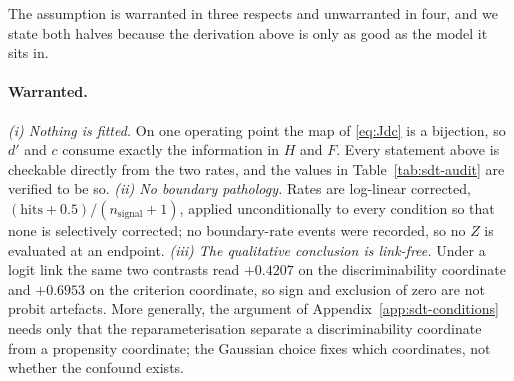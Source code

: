 The assumption is warranted in three respects and unwarranted in four, and we state both halves
because the derivation above is only as good as the model it sits in.

\paragraph{Warranted.} \emph{(i) Nothing is fitted.} On one operating point the map of
\eqref{eq:Jdc} is a bijection, so $d'$ and $c$ consume exactly the information in $H$ and $F$. Every
statement above is checkable directly from the two rates, and the values in
Table~\ref{tab:sdt-audit} are verified to be so. \emph{(ii) No boundary pathology.} Rates are
log-linear corrected, $(\mathrm{hits}+0.5)/(n_{\mathrm{signal}}+1)$, applied unconditionally to every
condition so that none is selectively corrected; no boundary-rate events were recorded, so no $Z$ is
evaluated at an endpoint. \emph{(iii) The qualitative conclusion is link-free.} Under a logit link
the same two contrasts read $+0.4207$  on the discriminability coordinate and
$+0.6953$  on the criterion coordinate, so sign and exclusion of zero are not
probit artefacts. More generally, the argument of Appendix~\ref{app:sdt-conditions} needs only that
the reparameterisation separate a discriminability coordinate from a propensity coordinate; the
Gaussian choice fixes which coordinates, not whether the confound exists.

